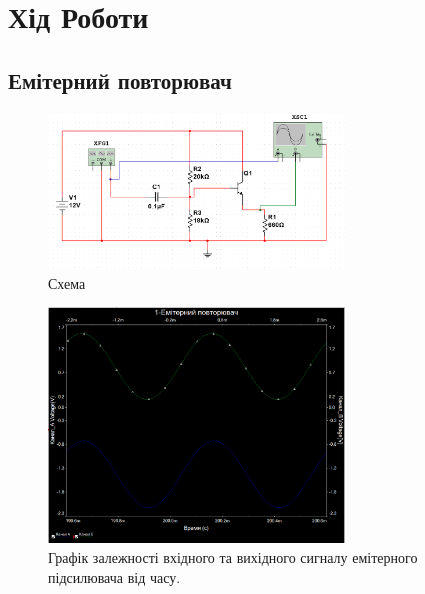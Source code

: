 \documentclass[
  ukrainian,
  14pt
]{extreport}
\begin{document}
\section{Хід Роботи}
\subsection{Емітерний повторювач}
\begin{figure}[H]
  \includegraphics[width=0.7\textwidth]{imgs/1-1.png}
  \centering
  \caption{Схема}
\end{figure}
\begin{figure}[H]
  \includegraphics[width=0.7\textwidth]{imgs/1-2.png}
  \centering
  \caption{Графік залежності вхідного та вихідного сигналу емітерного підсилювача від часу.
  }
\end{figure}
\end{document}
